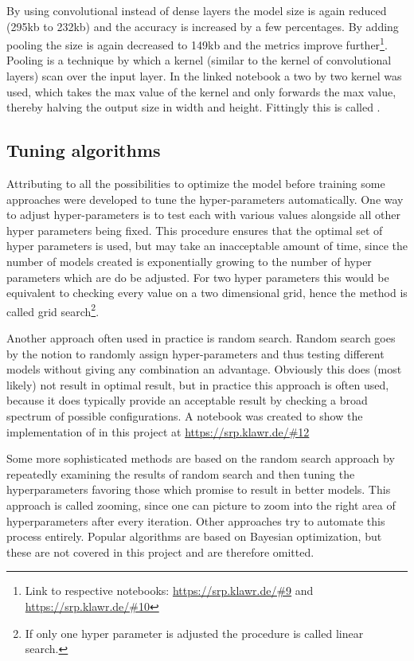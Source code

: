 By using convolutional instead of dense layers the model size is again reduced (295kb to 232kb) and the accuracy is increased by a few percentages. By adding pooling the size is again decreased to 149kb and the metrics improve further\footnote{Link to respective notebooks: \url{https://srp.klawr.de/\#9} and \url{https://srp.klawr.de/\#10}}.
Pooling is a technique by which a kernel (similar to the kernel of convolutional layers) scan over the input layer.
In the linked notebook a two by two kernel was used, which takes the max value of the kernel and only forwards the max value, thereby halving the output size in width and height.
Fittingly this is called .

\subsection{Tuning algorithms}

Attributing to all the possibilities to optimize the model before training some approaches were developed to tune the hyper-parameters automatically.
One way to adjust hyper-parameters is to test each with various values alongside all other hyper parameters being fixed.
This procedure ensures that the optimal set of hyper parameters is used, but may take an inacceptable amount of time, since the number of models created is exponentially growing to the number of hyper parameters which are do be adjusted.
For two hyper parameters this would be equivalent to checking every value on a two dimensional grid, hence the method is called grid search\footnote{If only one hyper parameter is adjusted the procedure is called linear search.}.

Another approach often used in practice is random search.
Random search goes by the notion to randomly assign hyper-parameters and thus testing different models without giving any combination an advantage.
Obviously this does (most likely) not result in optimal result, but in practice this approach is often used, because it does typically provide an acceptable result by checking a broad spectrum of possible configurations.
A notebook was created to show the implementation of  in this project at \url{https://srp.klawr.de/\#12}

Some more sophisticated methods are based on the random search approach by repeatedly examining the results of random search and then tuning the hyperparameters favoring those which promise to result in better models.
This approach is called zooming, since one can picture to zoom into the right area of hyperparameters after every iteration.
Other approaches try to automate this process entirely.
Popular algorithms are based on Bayesian optimization, but these are not covered in this project and are therefore omitted.

